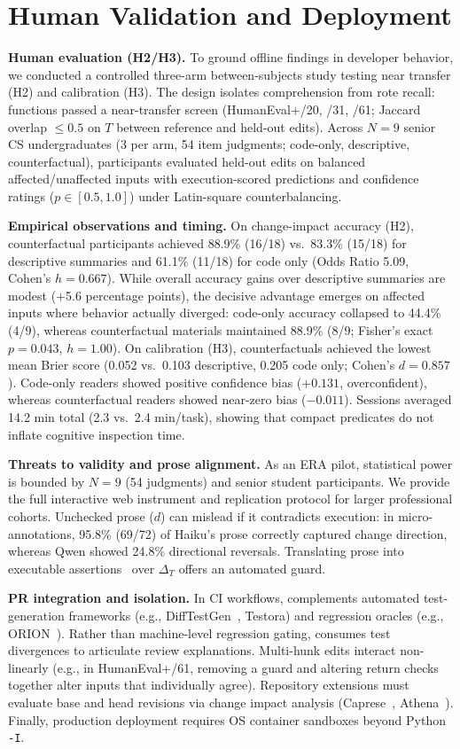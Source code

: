 \section{Human Validation and Deployment}\label{sec:agenda}
\textbf{Human evaluation (H2/H3).}
To ground offline findings in developer behavior, we conducted a controlled three-arm between-subjects study testing near transfer (H2) and calibration (H3). The design isolates comprehension from rote recall: functions passed a near-transfer screen (HumanEval+/20, /31, /61; Jaccard overlap $\le0.5$ on $T$ between reference and held-out edits). Across $N=9$ senior CS undergraduates (3 per arm, 54 item judgments; code-only, descriptive, counterfactual), participants evaluated held-out edits on balanced affected/unaffected inputs with execution-scored predictions and confidence ratings ($p\in[0.5, 1.0]$) under Latin-square counterbalancing.

\textbf{Empirical observations and timing.}
On change-impact accuracy (H2), counterfactual participants achieved 88.9\% (16/18) vs.\ 83.3\% (15/18) for descriptive summaries and 61.1\% (11/18) for code only (Odds Ratio 5.09, Cohen's $h=0.667$). While overall accuracy gains over descriptive summaries are modest (+5.6 percentage points), the decisive advantage emerges on affected inputs where behavior actually diverged: code-only accuracy collapsed to 44.4\% (4/9), whereas counterfactual materials maintained 88.9\% (8/9; Fisher's exact $p=0.043$, $h=1.00$). On calibration (H3), counterfactuals achieved the lowest mean Brier score (0.052 vs.\ 0.103 descriptive, 0.205 code only; Cohen's $d=0.857$). Code-only readers showed positive confidence bias ($+0.131$, overconfident), whereas counterfactual readers showed near-zero bias ($-0.011$). Sessions averaged 14.2 min total (2.3 vs.\ 2.4 min/task), showing that compact predicates do not inflate cognitive inspection time.

\textbf{Threats to validity and prose alignment.}
As an ERA pilot, statistical power is bounded by $N=9$ (54 judgments) and senior student participants. We provide the full interactive web instrument and replication protocol for larger professional cohorts. Unchecked prose ($d$) can mislead if it contradicts execution: in micro-annotations, 95.8\% (69/72) of Haiku's prose correctly captured change direction, whereas Qwen showed 24.8\% directional reversals. Translating prose into executable assertions~\cite{endres2024nl2postcond} over $\Delta_T$ offers an automated guard.

\textbf{PR integration and isolation.}
In CI workflows, \CoDE complements automated test-generation frameworks (e.g., DiffTestGen~\cite{hu2026difftestgen}, Testora) and regression oracles (e.g., ORION~\cite{fu2026orion}). Rather than machine-level regression gating, \CoDE consumes test divergences to articulate review explanations. Multi-hunk edits interact non-linearly (e.g., in HumanEval+/61, removing a guard and altering return checks together alter inputs that individually agree). Repository extensions must evaluate base and head revisions via change impact analysis (Caprese~\cite{fard2023caprese}, Athena~\cite{tufano2023athena}). Finally, production deployment requires OS container sandboxes beyond Python \texttt{-I}.
